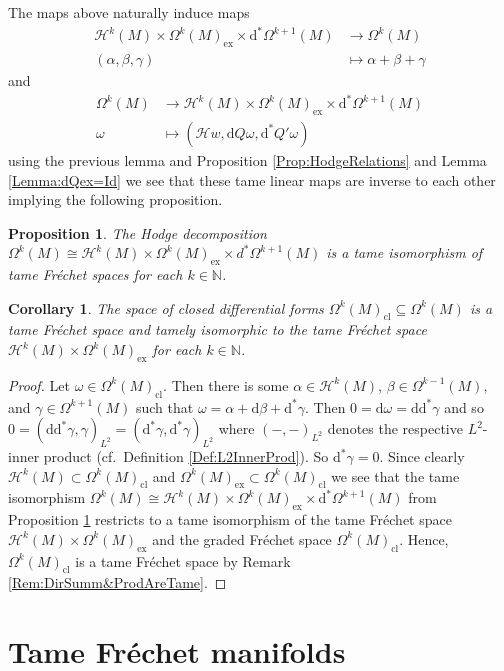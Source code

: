 \documentclass[12pt,a4paper]{article}
\theoremstyle{plain}
\newtheorem{corollary}[theorem]{Corollary}
\newtheorem{proposition}[theorem]{Proposition}
\theoremstyle{definition}
\newcommand{\N}{\mathbb{N}}
\newcommand{\om}{\omega}
\newcommand{\Forms}[1]{\Omega^{#1}(M)}
\newcommand{\ClForms}[1]{\Forms{#1}_{\mathrm{cl}}}
\newcommand{\ExForms}[1]{\Forms{#1}_{\mathrm{ex}}}
\newcommand{\Hcal}{\mathcal{H}}
\renewcommand{\d}{\mathrm{d}}
\begin{document}
The maps above naturally induce maps
\begin{align*}
    \Hcal^k(M)\times\ExForms{k}\times \d^*\Forms{k+1}&\to \Forms{k}\\
    (\alpha,\beta,\gamma)&\mapsto \alpha+\beta+\gamma
\end{align*}
and 
\begin{align*}
    \Forms{k}&\to \Hcal^k(M)\times\ExForms{k}\times \d^*\Forms{k+1}\\
    \om&\mapsto (\Hcal w,\d Q \om,\d^*Q'\om)
\end{align*}
using the previous lemma and Proposition \ref{Prop:HodgeRelations} and Lemma \ref{Lemma:dQex=Id} we see that these tame linear maps are inverse to each other implying the following proposition.


\begin{proposition}
\label{Prop:HodgeDecompTameIso}
The Hodge decomposition
$\Forms{k}\cong\Hcal^k(M)\times \ExForms{k}\times d^*\Forms{k+1}$ is a tame isomorphism of tame Fréchet spaces for each $k\in \N$.
\end{proposition}

\begin{corollary}
\label{Cor:ClFormsTameDirSumm}
The space of closed differential forms $\ClForms{k}\subseteq \Forms{k}$ is a tame Fréchet space and tamely isomorphic to the tame Fréchet space $\Hcal^k(M)\times \ExForms{k}$ for each $k\in \N$.
\end{corollary}
\begin{proof}
Let $\om\in\ClForms{k}$. Then there is some $\alpha\in \Hcal^k(M)$, $\beta\in \Forms{k-1}$, and
$\gamma\in \Forms{k+1}$ such that $\om=\alpha+\d\beta+\d^*\gamma$. Then $0=\d\om=\d \d^*\gamma$ and so 
$0=(\d \d^*\gamma,\gamma)_{L^2}=(\d^*\gamma,\d^*\gamma)_{L^2}$ where $(-,-)_{L^2}$ denotes the respective $L^2$-inner product (cf.~Definition \ref{Def:L2InnerProd}). So $\d^*\gamma=0$. Since clearly $\Hcal^k(M)\subset \ClForms{k}$ and 
$\ExForms{k}\subset \ClForms{k}$ we see that the tame isomorphism
$\Forms{k}\cong\Hcal^k(M)\times \ExForms{k}\times \d^*\Forms{k+1}$ from Proposition \ref{Prop:HodgeDecompTameIso} restricts to a tame isomorphism of the tame Fréchet space $\Hcal^k(M)\times \ExForms{k}$ and the graded Fréchet space $\ClForms{k}$. Hence, $\ClForms{k}$ is a tame Fréchet space by Remark \ref{Rem:DirSumm&ProdAreTame}.
\end{proof}




\section{Tame Fréchet manifolds}
\label{Section:TameFrechetManifolds}
\end{document}
